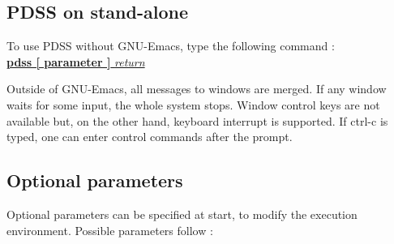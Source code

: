 \subsection{PDSS on stand-alone}

To use PDSS without GNU-Emacs, type the following command :
\vspace{2ex}\\
\hspace*{10em}\underline{{\bf pdss [ parameter ]} {\it return}}
\vspace{2ex}

Outside of GNU-Emacs, all messages to windows are merged. If any window waits
for some input, the whole system stops. Window control keys are not available
but, on the other hand, keyboard interrupt is supported. If ctrl-c is typed,
one can enter control commands after the prompt.

\subsection{Optional parameters}

Optional parameters can be specified at start, to modify the execution
environment. Possible parameters follow :
\vspace{1ex}

